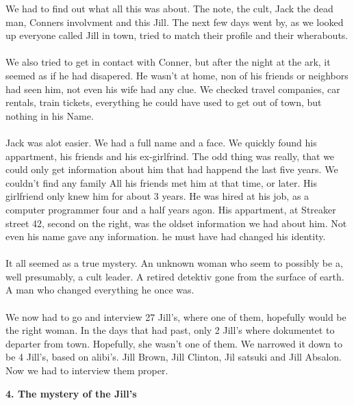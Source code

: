 \documentclass[]{article}
\begin{document}
We had to find out what all this was about. The note, the cult, Jack the dead man, Conners involvment and this Jill. The next few days went by, as we looked up everyone called Jill in town, tried to match their profile and their wherabouts. 
\\ \\
We also tried to get in contact with Conner, but after the night at the ark, it seemed as if he had disapered. He wasn't at home, non of his friends or neighbors had seen him, not even his wife had any clue. We checked travel companies, car rentals, train tickets, everything he could have used to get out of town, but nothing in his Name. 
\\ \\
Jack was alot easier. We had a full name and a face. We quickly found his appartment, his friends and his ex-girlfrind. The odd thing was really, that we could only get information about him that had happend the last five years. We couldn't find any family All his friends met him at that time, or later. His girlfriend only knew him for about 3 years. He was hired at his job, as a computer programmer four and a half years agon. His appartment, at Streaker street 42, second on the right, was the oldset information we had about him. Not even his name gave any information. he must have had changed his identity. 
\\ \\
It all seemed as a true mystery. An unknown woman who seem to possibly be a, well presumably, a cult leader. A retired detektiv gone from the surface of earth. A man who changed everything he once was.
\\ \\
We now had to go and interview 27 Jill's, where one of them, hopefully would be the right woman. In the days that had past, only 2 Jill's where dokumentet to departer from town. Hopefully, she wasn't one of them. We narrowed it down to be 4 Jill's, based on alibi's. Jill Brown, Jill Clinton, Jil satsuki and Jill Absalon. Now we had to interview them proper.

\begin{center}
	\large\textbf{4. The mystery of the Jill's}
\end{center}
\end{document}
